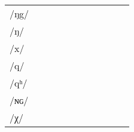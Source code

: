 \documentclass[oldfontcommands,oneside,a4paper,11pt]{article}
\newcommand{\ipa}[1]{\mbox{/#1/}} %
\begin{document}
\begin{landscape}
\begin{longtable}{l|lll|lll|lll|l}
\ipa{ŋg} 	& 	  	& 	  	& 	  	& 	  	& 	  	& 	& 	  	& 	  	& 	 \\  
\ipa{ŋ}	& 	  	& 	  	& 	  	& 	  	& 	  	& 	& 	  	& 	  	& 	 \\  
\ipa{x}	& 	  	& 	  	& 	  	& 	  	& 	  	& 	& 	  	& 	  	& 	 \\  
\ipa{q} 	& 	  	& 	  	& 	  	& 	  	& 	  	& 	& 	  	& 	  	& 	 \\  
\ipa{qʰ} 	& 	  	& 	  	& 	  	& 	  	& 	  	& 	& 	  	& 	  	& 	 \\  
\ipa{ɴɢ} 	& 	  	& 	  	& 	  	& 	  	& 	  	& 	& 	  	& 	  	& 	 \\  
\ipa{χ} 	& 	  	& 	  	& 	  	& 	  	& 	  	& 	& 	  	& 	  	& 	 \\  
\bottomrule
\end{longtable}


\end{landscape}
\end{document}
